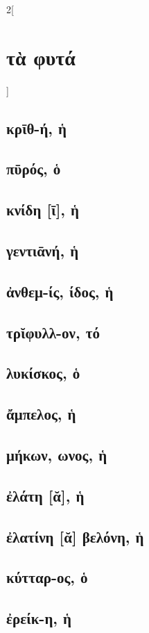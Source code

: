 \documentclass{book}
\begin{document}
\begin{multicols}{2}[\section{τὰ φυτά}]
\subsection{κρῑθ-ή, ἡ}
\subsection{πῡρός, ὁ}
\subsection{κνίδη [ῑ], ἡ}
\subsection{γεντιᾱνή, ἡ}
\subsection{ἀνθεμ-ίς, ίδος, ἡ}
\subsection{τρῐφυλλ-ον, τό}
\subsection{λυκίσκος, ὁ}
\subsection{ἄμπελος, ἡ}
\subsection{μήκων, ωνος, ἡ}
\subsection{ἐλάτη [ᾰ], ἡ}
\subsection{ἐλατίνη [ᾰ] βελόνη, ἡ}
\subsection{κύτταρ-ος, ὁ}
\subsection{ἐρείκ-η, ἡ}

\end{multicols}
\end{document}
